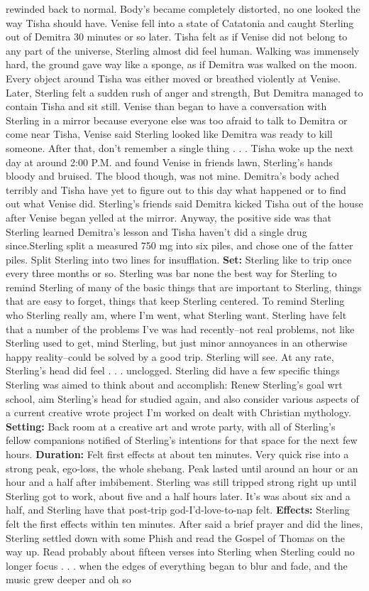 \documentclass[12pt]{book}
\begin{document}
rewinded back to normal. Body's became completely distorted, no one looked the way Tisha should have. Venise fell into a state of Catatonia and caught Sterling out of Demitra 30 minutes or so later. Tisha felt as if Venise did not belong to any part of the universe, Sterling almost did feel human. Walking was immensely hard, the ground gave way like a sponge, as if Demitra was walked on the moon. Every object around Tisha was either moved or breathed violently at Venise. Later, Sterling felt a sudden rush of anger and strength, But Demitra managed to contain Tisha and sit still. Venise than began to have a conversation with Sterling in a mirror because everyone else was too afraid to talk to Demitra or come near Tisha, Venise said Sterling looked like Demitra was ready to kill someone. After that, don't remember a single thing . . .  Tisha woke up the next day at around 2:00 P.M. and found Venise in friends lawn, Sterling's hands bloody and bruised. The blood though, was not mine. Demitra's body ached terribly and Tisha have yet to figure out to this day what happened or to find out what Venise did. Sterling's friends said Demitra kicked Tisha out of the house after Venise began yelled at the mirror. Anyway, the positive side was that Sterling learned Demitra's lesson and Tisha haven't did a single drug since.Sterling split a measured 750 mg into six piles, and chose one of the fatter piles. Split Sterling into two lines for insufflation. \textbf{Set:} Sterling like to trip once every three months or so. Sterling was bar none the best way for Sterling to remind Sterling of many of the basic things that are important to Sterling, things that are easy to forget, things that keep Sterling centered. To remind Sterling who Sterling really am, where I'm went, what Sterling want. Sterling have felt that a number of the problems I've was had recently--not real problems, not like Sterling used to get, mind Sterling, but just minor annoyances in an otherwise happy reality--could be solved by a good trip. Sterling will see. At any rate, Sterling's head did feel . . .  unclogged. Sterling did have a few specific things Sterling was aimed to think about and accomplish: Renew Sterling's goal wrt school, aim Sterling's head for studied again, and also consider various aspects of a current creative wrote project I'm worked on dealt with Christian mythology. \textbf{Setting:} Back room at a creative art and wrote party, with all of Sterling's fellow companions notified of Sterling's intentions for that space for the next few hours. \textbf{Duration:} Felt first effects at about ten minutes. Very quick rise into a strong peak, ego-loss, the whole shebang. Peak lasted until around an hour or an hour and a half after imbibement. Sterling was still tripped strong right up until Sterling got to work, about five and a half hours later. It's was about six and a half, and Sterling have that post-trip god-I'd-love-to-nap felt. \textbf{Effects:} Sterling felt the first effects within ten minutes. After said a brief prayer and did the lines, Sterling settled down with some Phish and read the Gospel of Thomas on the way up. Read probably about fifteen verses into Sterling when Sterling could no longer focus . . .  when the edges of everything began to blur and fade, and the music grew deeper and oh so 
\end{document}
